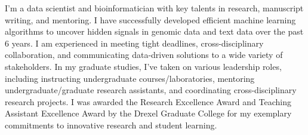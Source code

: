

\begin{cvparagraph}

I’m a data scientist and bioinformatician with key talents in research, manuscript writing, and mentoring. I have successfully developed efficient machine learning algorithms to uncover hidden signals in genomic data and text data over the past 6 years. I am experienced in meeting tight deadlines, cross-disciplinary collaboration, and communicating data-driven solutions to a wide variety of stakeholders. In my graduate studies, I’ve taken on various leadership roles, including instructing undergraduate courses/laboratories, mentoring undergraduate/graduate research assistants, and coordinating cross-disciplinary research projects. I was awarded the Research Excellence Award and Teaching Assistant Excellence Award by the Drexel Graduate College for my exemplary commitments to innovative research and student learning. 
\end{cvparagraph}